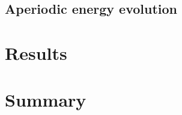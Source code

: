 \subsection{\color{red}Aperiodic energy evolution}
\label{sec:non-perio}


\section{\color{red}Results}


\section{\color{red}Summary}

